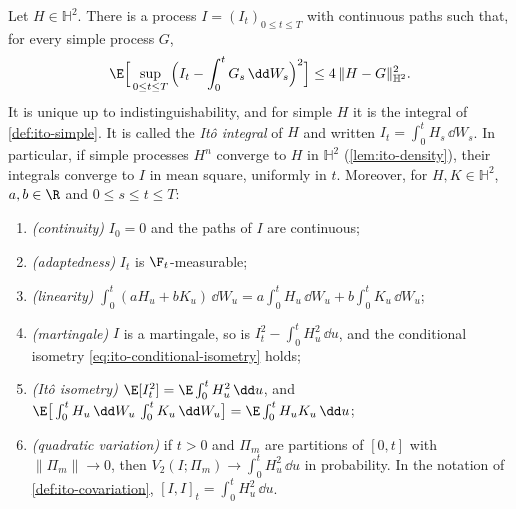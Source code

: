 \begin{theorem}\label{thm:ito-integral}
Let $H\in\mathbb H^2$. There is a process $I=(I_t)_{0\le t\le T}$ with continuous paths such
that, for every simple process $G$,
\begin{equation}\label{eq:ito-uniform}
  \E\Big[\sup_{0\le t\le T}\Big(I_t-\int_0^tG_s\,\dd W_s\Big)^2\Big]\le4\,\|H-G\|_{\mathbb H^2}^2 .
\end{equation}
It is unique up to indistinguishability, and for simple $H$ it is the integral of
\cref{def:ito-simple}. It is called the \emph{It\^o integral} of $H$ and written
$I_t=\int_0^tH_s\,\dd W_s$. In particular, if simple processes $H^n$ converge to $H$ in
$\mathbb H^2$ (\cref{lem:ito-density}), their integrals converge to $I$ in mean square,
uniformly in $t$. Moreover, for $H,K\in\mathbb H^2$, $a,b\in\R$ and $0\le s\le t\le T$:
\begin{enumerate}[label=(\roman*)]
  \item \emph{(continuity)} $I_0=0$ and the paths of $I$ are continuous;
  \item \emph{(adaptedness)} $I_t$ is $\F_t$-measurable;
  \item \emph{(linearity)}
    $\int_0^t(aH_u+bK_u)\,\dd W_u=a\int_0^tH_u\,\dd W_u+b\int_0^tK_u\,\dd W_u$;
  \item \emph{(martingale)} $I$ is a martingale, so is $I_t^2-\int_0^tH_u^2\,\dd u$, and the
    conditional isometry \eqref{eq:ito-conditional-isometry} holds;
  \item \emph{(It\^o isometry)} $\E[I_t^2]=\E\int_0^tH_u^2\,\dd u$, and
    $\E\big[\int_0^tH_u\,\dd W_u\,\int_0^tK_u\,\dd W_u\big]=\E\int_0^tH_uK_u\,\dd u$;
  \item \emph{(quadratic variation)} if $t>0$ and $\Pi_m$ are partitions of $[0,t]$ with
    $\|\Pi_m\|\to0$, then $V_2(I;\Pi_m)\to\int_0^tH_u^2\,\dd u$ in probability. In the notation
    of \cref{def:ito-covariation}, $[I,I]_t=\int_0^tH_u^2\,\dd u$.
\end{enumerate}
\end{theorem}

